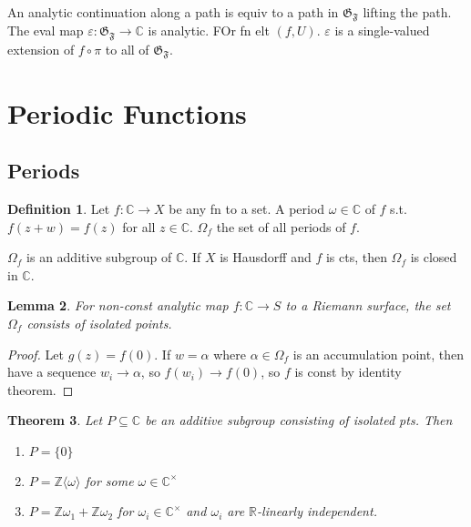 \documentclass{article}
\theoremstyle{definition}
\newtheorem{defn}{Definition}[section]
\theoremstyle{remark}
\theoremstyle{plain}
\newtheorem{lem}[defn]{Lemma}
\newtheorem{thm}[defn]{Theorem}
\newcommand{\ZZ}{\mathbb{Z}}
\newcommand{\RR}{\mathbb{R}}
\newcommand{\CC}{\mathbb{C}}
\newcommand{\e}{\varepsilon}
\begin{document}
An analytic continuation along a path is equiv to a path in $\mathfrak G_{\mathfrak F}$ lifting the path. The eval map $\e:\mathfrak G_{\mathfrak F}\to\CC$ is analytic. FOr fn elt $(f,U)$. $\e$ is a single-valued extension of $f\circ\pi$ to all of $\mathfrak G_{\mathfrak F}$.

\section{Periodic Functions}
\subsection{Periods}
\begin{defn}
    Let $f:\CC\to X$ be any fn to a set. A period $\omega\in\CC$ of $f$ s.t. $f(z+w)=f(z)$ for all $z\in\CC$. $\Omega_f$ the set of all periods of $f$.
\end{defn}
$\Omega_f$ is an additive subgroup of $\CC$. If $X$ is Hausdorff and $f$ is cts, then $\Omega_f$ is closed in $\CC$.
\begin{lem}
    For non-const analytic map $f:\CC\to S$ to a Riemann surface, the set $\Omega_f$ consists of isolated points.
\end{lem}
\begin{proof}
    Let $g(z)=f(0)$. If $w=\alpha$ where $\alpha\in\Omega_f$ is an accumulation point, then have a sequence $w_i\to\alpha$, so $f(w_i)\to f(0)$, so $f$ is const by identity theorem.
\end{proof}
\begin{thm}
    Let $P\subseteq\CC$ be an additive subgroup consisting of isolated pts. Then
    \begin{enumerate}
        \item[(0)] $P=\{0\}$
        \item[(1)] $P=\ZZ\langle\omega\rangle$ for some $\omega\in\CC^\times$
        \item[(2)] $P=\ZZ\omega_1+\ZZ\omega_2$ for $\omega_i\in\CC^\times$ and $\omega_i$ are $\RR$-linearly independent.
    \end{enumerate}
\end{thm}
\end{document}

